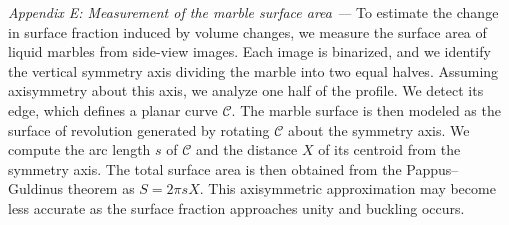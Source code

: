 \documentclass[twocolumn, prl,
 amsmath,amssymb,
 superscriptaddress,aps,
]{revtex4-2}
\begin{document}
\textit{Appendix E: Measurement of the marble surface area ---} To estimate the change in surface fraction induced by volume changes, we measure the surface area of liquid marbles from side-view images. Each image is binarized, and we identify the vertical symmetry axis dividing the marble into two equal halves. Assuming axisymmetry about this axis, we analyze one half of the profile. We detect its edge, which defines a planar curve $\mathcal{C}$. The marble surface is then modeled as the surface of revolution generated by rotating $\mathcal{C}$ about the symmetry axis. We compute the arc length $s$ of $\mathcal{C}$ and the distance $X$ of its centroid from the symmetry axis. The total surface area is then obtained from the Pappus--Guldinus theorem as $S = 2\pi s X$. This axisymmetric approximation may become less accurate as the surface fraction approaches unity and buckling occurs.
\\
\end{document}
